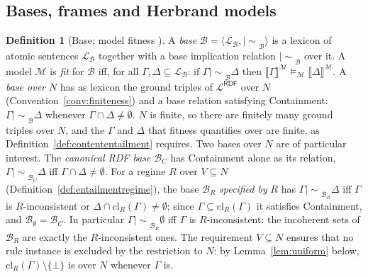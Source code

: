 \documentclass[12pt]{article}
\newcommand{\imp}{\mathrel{\mid\!\sim}}
\theoremstyle{definition}
\newtheorem{definition}{Definition}
\newcommand{\tuple}[1]{\langle #1 \rangle}
\newcommand{\Lrdf}{\mathcal{L}^{\mathsf{RDF}}}  %
\newcommand{\sem}[1]{\llbracket #1 \rrbracket}  %
\newcommand{\bmap}{\mathfrak{B}}  %
\newcommand{\Mcal}{\mathcal{M}}   %
\newcommand{\Bcal}{\mathcal{B}}   %
\newcommand{\cl}{\mathrm{cl}}   %
\begin{document}
\subsection{Bases, frames and Herbrand models}
\label{sec:bases}

\begin{definition}[Base; model fitness {\citep[Def.~75]{hlobil2025reasons}}]
\label{def:fitness}
A \textit{base} $\Bcal = \tuple{\mathcal{L}_{\Bcal}, \imp_{\Bcal}}$ is a lexicon of atomic sentences $\mathcal{L}_{\Bcal}$ together with a base implication relation $\imp_{\Bcal}$ over it. A model $\Mcal$ is \textit{fit} for $\Bcal$ iff, for all $\Gamma, \Delta \subseteq \mathcal{L}_{\Bcal}$: if $\Gamma \imp_{\Bcal} \Delta$ then $\sem{\Gamma}^{\Mcal} \models_{\Mcal} \sem{\Delta}^{\Mcal}$. A \textit{base over $N$} has as lexicon the ground triples of $\Lrdf$ over $N$ (Convention~\ref{conv:finiteness}) and a base relation satisfying Containment: $\Gamma \imp_{\Bcal} \Delta$ whenever $\Gamma \cap \Delta \neq \emptyset$. $N$ is finite, so there are finitely many ground triples over $N$, and the $\Gamma$ and $\Delta$ that fitness quantifies over are finite, as Definition~\ref{def:contententailment} requires. Two bases over $N$ are of particular interest. The \textit{canonical RDF base} $\Bcal_{C}$ has Containment alone as its relation, $\Gamma \imp_{\Bcal_{C}} \Delta$ iff $\Gamma \cap \Delta \neq \emptyset$. 
For a regime $R$ over $V \subseteq N$ (Definition~\ref{def:entailmentregime}), the base $\Bcal_{R}$ \textit{specified by} $R$ has $\Gamma \imp_{\Bcal_{R}} \Delta$ iff $\Gamma$ is $R$-inconsistent or $\Delta \cap \cl_R(\Gamma) \neq \emptyset$; since $\Gamma \subseteq \cl_R(\Gamma)$ it satisfies Containment, and $\Bcal_{\emptyset} = \Bcal_{C}$. In particular $\Gamma \imp_{\Bcal_{R}} \emptyset$ iff $\Gamma$ is $R$-inconsistent: the incoherent sets of $\Bcal_{R}$ are exactly the $R$-inconsistent ones.
The requirement $V \subseteq N$ ensures that no rule instance is excluded by the restriction to $N$: by Lemma~\ref{lem:uniform} below, $\cl_R(\Gamma) \setminus \{\bot\}$ is over $N$ whenever $\Gamma$ is.
\end{definition}
\end{document}
